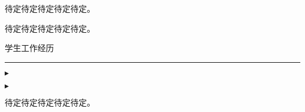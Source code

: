 \documentclass{resume}
\begin{document}

\hspace*{2em}待定待定待定待定待定。


\hspace*{2em}待定待定待定待定待定。

\bigskip

{\large\heiti 学生工作经历}

\smallskip
\hrule
\medskip

$\blacktriangleright$

\begin{minipage}{0.48 \textwidth} 
    
\end{minipage}
\hspace{0.03 \textwidth}
\begin{minipage}{0.48 \textwidth}
\end{minipage}

$\blacktriangleright$

待定待定待定待定待定。
\end{document}
